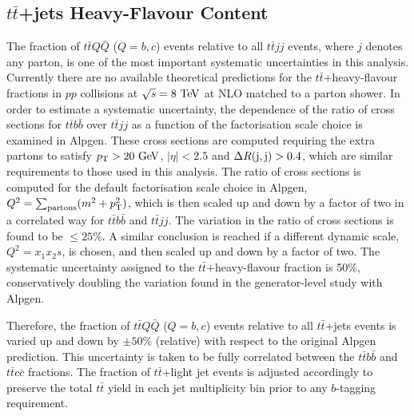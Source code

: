 
\subsection{$t\bar{t}$+jets Heavy-Flavour Content}
\label{sec:syst_ttbarHF}
The fraction of $t\bar{t}Q\bar{Q}$ ($Q=b,c$) events relative to all $t\bar{t}jj$ events, where $j$ denotes any parton,
is one of the most important systematic uncertainties in this analysis. 
Currently there are no available theoretical predictions for the $t\bar{t}$+heavy-flavour fractions in $pp$ collisions at $\sqrt{s}=8\tev$ at NLO matched to a parton shower.
In order to estimate a systematic uncertainty, the dependence of the ratio of cross sections for $t\bar{t}b\bar{b}$ over
$t\bar{t}jj$ as a function of the factorisation scale choice is examined in {\sc Alpgen}. These cross
sections are computed requiring the extra partons to satisfy $\pt>20\gev$, $|\eta|<2.5$ and $\Delta R({\rm j},{\rm j})>0.4$, which are similar requirements
to those used in this analysis. The ratio of cross sections is computed for the default factorisation scale choice
in {\sc Alpgen}, $Q^2=\sum_{\rm partons} (m^2 + \pt^2)$, which is then scaled up and down by a factor of two
in a correlated way for $t\bar{t}b\bar{b}$ and $t\bar{t}jj$.
The variation in the ratio of cross sections is found to be $\leq 25\%$. A similar conclusion is reached if a
different dynamic scale,  $Q^2=x_1 x_2 s$, is chosen, and then scaled up and down by a factor of two.
The systematic uncertainty assigned to the $t\bar{t}$+heavy-flavour fraction is 50\%, conservatively doubling
the variation found in the generator-level study with {\sc Alpgen}. 

Therefore, the fraction of $t\bar{t}Q\bar{Q}$ ($Q=b,c$) events relative to all $t\bar{t}$+jets events
is varied up and down by $\pm 50\%$ (relative) with respect to the original {\sc Alpgen} prediction. 
This uncertainty is taken to be fully correlated between the $t\bar{t}b\bar{b}$ and $t\bar{t}c\bar{c}$ fractions.
The fraction of $t\bar{t}$+light jet events is adjusted accordingly to preserve the total $t\bar{t}$ yield in each jet multiplicity bin 
prior to any $b$-tagging requirement.



